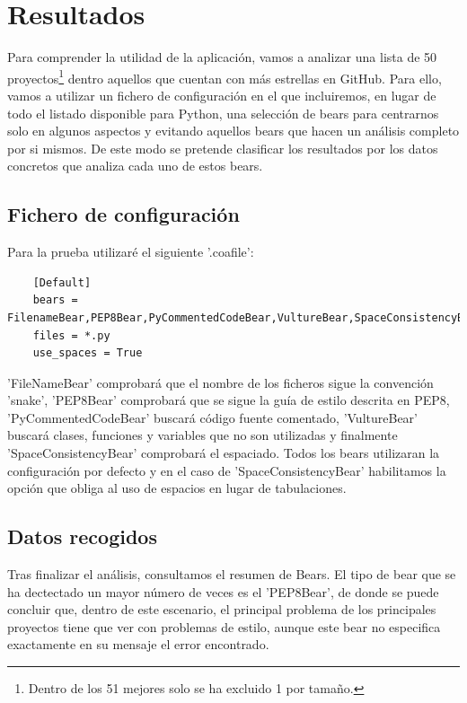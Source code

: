 \documentclass[a4paper, 12pt]{book}
\begin{document}

\cleardoublepage
\chapter{Resultados}
Para comprender la utilidad de la aplicación, vamos a analizar una lista de 50 proyectos\footnote{Dentro de los 51 mejores solo se ha excluido 1 por tamaño.} dentro aquellos que cuentan con más estrellas en GitHub. Para ello, vamos a utilizar un fichero de configuración en el que incluiremos, en lugar de todo el listado disponible para Python, una selección de bears para centrarnos solo en algunos aspectos y evitando aquellos bears que hacen un análisis completo por si mismos. De este modo se pretende clasificar los resultados por los datos concretos que analiza cada uno de estos bears.

\section{Fichero de configuración}
\label{sec:_coafile}
Para la prueba utilizaré el siguiente '.coafile':

{\footnotesize
\begin{verbatim}
    [Default]
    bears = FilenameBear,PEP8Bear,PyCommentedCodeBear,VultureBear,SpaceConsistencyBear
    files = *.py
    use_spaces = True
\end{verbatim}
}
'FileNameBear' comprobará que el nombre de los ficheros sigue la convención 'snake', 'PEP8Bear' comprobará que se sigue la guía de estilo descrita en PEP8, 'PyCommentedCodeBear' buscará código fuente comentado, 'VultureBear' buscará clases, funciones y variables que no son utilizadas y finalmente 'SpaceConsistencyBear' comprobará el espaciado. Todos los bears utilizaran la configuración por defecto y en el caso de 'SpaceConsistencyBear' habilitamos la opción que obliga al uso de espacios en lugar de tabulaciones.

\section{Datos recogidos}
\label{sec:_datarec}
Tras finalizar el análisis, consultamos el resumen de Bears. El tipo de bear que se ha dectectado un mayor número de veces es el 'PEP8Bear', de donde se puede concluir que, dentro de este escenario, el principal problema de los principales proyectos tiene que ver con problemas de estilo, aunque este bear no especifica exactamente en su mensaje el error encontrado.
\end{document}
